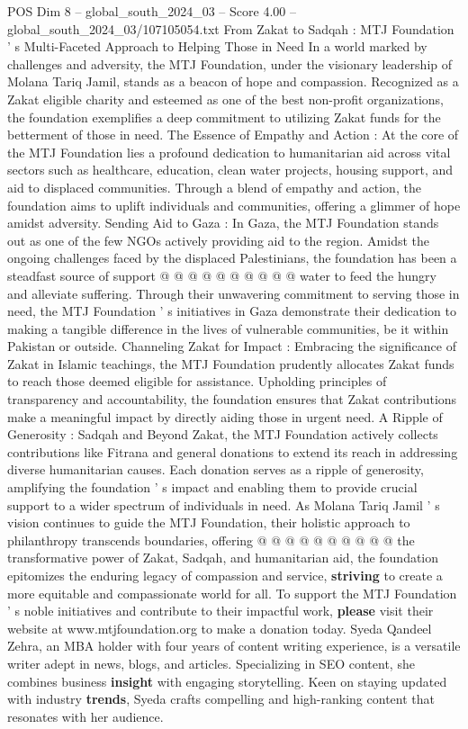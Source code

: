 \begin{textsample}{POS Dim 8 – global\_south\_2024\_03 – Score 4.00 – global\_south\_2024\_03/107105054.txt}  \label{ex:f8_pos_421}
From Zakat to Sadqah : MTJ Foundation ' s Multi-Faceted Approach to Helping Those in Need In a world marked by challenges and adversity, the MTJ Foundation, under the visionary leadership of Molana Tariq Jamil, stands as a beacon of hope and compassion.
Recognized as a Zakat eligible charity and esteemed as one of the best non-profit organizations, the foundation exemplifies a deep commitment to utilizing Zakat funds for the betterment of those in need.
The Essence of Empathy and Action : At the core of the MTJ Foundation lies a profound dedication to humanitarian aid across vital sectors such as healthcare, education, clean water projects, housing support, and aid to displaced communities.
Through a blend of empathy and action, the foundation aims to uplift individuals and communities, offering a glimmer of hope amidst adversity.
Sending Aid to Gaza : In Gaza, the MTJ Foundation stands out as one of the few NGOs actively providing aid to the region.
Amidst the ongoing challenges faced by the displaced Palestinians, the foundation has been a steadfast source of support @ @ @ @ @ @ @ @ @ @ water to feed the hungry and alleviate suffering.
Through their unwavering commitment to serving those in need, the MTJ Foundation ' s initiatives in Gaza demonstrate their dedication to making a tangible difference in the lives of vulnerable communities, be it within Pakistan or outside.
Channeling Zakat for Impact : Embracing the significance of Zakat in Islamic teachings, the MTJ Foundation prudently allocates Zakat funds to reach those deemed eligible for assistance.
Upholding principles of transparency and accountability, the foundation ensures that Zakat contributions make a meaningful impact by directly aiding those in urgent need.
A Ripple of Generosity : Sadqah and Beyond Zakat, the MTJ Foundation actively collects contributions like Fitrana and general donations to extend its reach in addressing diverse humanitarian causes.
Each donation serves as a ripple of generosity, amplifying the foundation ' s impact and enabling them to provide crucial support to a wider spectrum of individuals in need.
As Molana Tariq Jamil ' s vision continues to guide the MTJ Foundation, their holistic approach to philanthropy transcends boundaries, offering @ @ @ @ @ @ @ @ @ @ the transformative power of Zakat, Sadqah, and humanitarian aid, the foundation epitomizes the enduring legacy of compassion and service, \textbf{striving} to create a more equitable and compassionate world for all.
To support the MTJ Foundation ' s noble initiatives and contribute to their impactful work, \textbf{please} visit their website at www.mtjfoundation.org to make a donation today.
Syeda Qandeel Zehra, an MBA holder with four years of content writing experience, is a versatile writer adept in news, blogs, and articles.
Specializing in SEO content, she combines business \textbf{insight} with engaging storytelling.
Keen on staying updated with industry \textbf{trends}, Syeda crafts compelling and high-ranking content that resonates with her audience.

\end{textsample}
